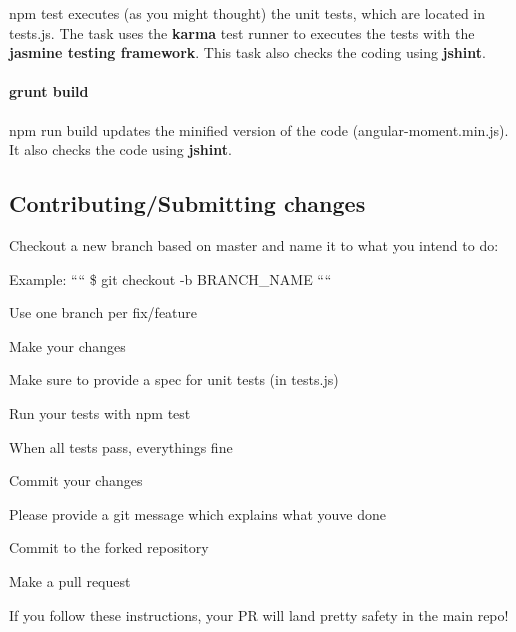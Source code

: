 {\ttfamily npm test} executes (as you might thought) the unit tests, which are located in {\ttfamily tests.\+js}. The task uses the {\bfseries karma} test runner to executes the tests with the {\bfseries jasmine testing framework}. This task also checks the coding using {\bfseries jshint}.

\paragraph*{grunt build}

{\ttfamily npm run build} updates the minified version of the code (angular-\/moment.\+min.\+js). It also checks the code using {\bfseries jshint}.

\subsection*{Contributing/\+Submitting changes}


\begin{DoxyItemize}
\item Checkout a new branch based on {\ttfamily master} and name it to what you intend to do\+:
\begin{DoxyItemize}
\item Example\+: ```` \$ git checkout -\/b B\+R\+A\+N\+C\+H\+\_\+\+N\+A\+ME ````
\item Use one branch per fix/feature
\end{DoxyItemize}
\item Make your changes
\begin{DoxyItemize}
\item Make sure to provide a spec for unit tests (in {\ttfamily tests.\+js})
\item Run your tests with {\ttfamily npm test}
\item When all tests pass, everything\textquotesingle{}s fine
\end{DoxyItemize}
\item Commit your changes
\begin{DoxyItemize}
\item Please provide a git message which explains what you\textquotesingle{}ve done
\item Commit to the forked repository
\end{DoxyItemize}
\item Make a pull request
\end{DoxyItemize}

If you follow these instructions, your PR will land pretty safety in the main repo! 